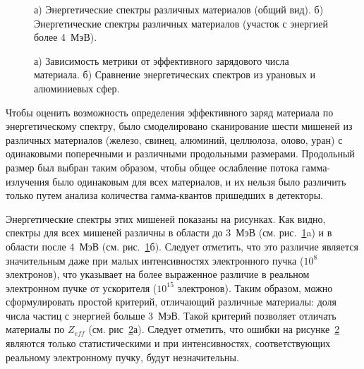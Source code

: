 \begin{figure}[t]
    \begin{center}
        \begin{minipage}[h]{0.49\linewidth}
        \end{minipage}
        \hfill
        \begin{minipage}[h]{0.49\linewidth}
        \end{minipage} 
        \caption{а) Энергетические спектры различных материалов (общий вид).
            б) Энергетические спектры различных материалов (участок с энергией более 4~МэВ).}
    \end{center}
    \label{pic:diff0}
\end{figure}
\begin{figure}[t]
    \begin{center}
        \begin{minipage}[h]{0.49\linewidth}
        \end{minipage}
        \hfill
        \begin{minipage}[h]{0.49\linewidth}
        \end{minipage}
        \caption{а) Зависимость метрики от эффективного зарядового числа материала.
            б) Сравнение энергетических спектров из урановых и алюминиевых сфер.}
    \end{center}
    \label{pic:diff}
\end{figure}

Чтобы оценить возможность определения эффективного заряд материала по энергетическому спектру, было смоделировано сканирование шести мишеней из различных материалов (железо, свинец, алюминий, целлюлоза, олово, уран) с одинаковыми поперечными и различными продольными размерами. Продольный размер был выбран таким образом, чтобы общее ослабление потока гамма-излучения было одинаковым для всех материалов, и их нельзя было различить только путем анализа количества гамма-квантов пришедших в детекторы.

Энергетические спектры этих мишеней показаны на рисунках. Как видно, спектры для всех мишеней различны в области до 3~МэВ (см. рис.~\ref{pic:diff0}a) и в области после 4~МэВ (см. рис.~\ref{pic:diff0}б). Следует отметить, что это различие является значительным даже при малых интенсивностях электронного пучка ($10^8$ электронов), что указывает на более выраженное различие в реальном электронном пучке от ускорителя ($10^{15}$ электронов). Таким образом, можно сформулировать простой критерий, отличающий различные материалы: доля числа частиц с энергией больше 3~МэВ. Такой критерий позволяет отличать материалы по $Z_{eff}$ (см. рис~\ref{pic:diff}а). Следует отметить, что ошибки на рисунке~\ref{pic:diff} являются только статистическими и при интенсивностях, соответствующих реальному электронному пучку, будут незначительны.

